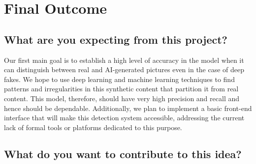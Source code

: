 \documentclass[10pt,twocolumn,letterpaper]{article}
\begin{document}
\section{Final Outcome}

\subsection{What are you expecting from this project?}

Our first main goal is to establish a high level of accuracy in the model when it can distinguish between real and AI-generated pictures even in the case of deep fakes. 
We hope to use deep learning and machine learning techniques to find patterns and irregularities in this synthetic content that partition it from real content. 
This model, therefore, should have very high precision and recall and hence should be dependable.
Additionally, we plan to implement a basic front-end interface that will make this detection system accessible, addressing the current lack of formal tools or platforms dedicated to this purpose.

\subsection{What do you want to contribute to this idea?}
\end{document}
